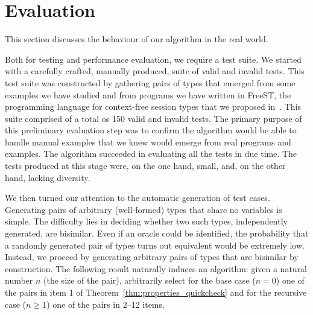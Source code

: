 \section{Evaluation}
\label{sec:evaluation}

This section discusses the behaviour of our algorithm in the real
world.

Both for testing and performance evaluation, we require a test
suite. We started with a carefully crafted, manually produced, suite of
valid and invalid tests. This test suite was constructed by gathering
pairs of types that emerged from some examples we have
studied and from programs we have written in FreeST, the programming language 
for context-free session types that we 
proposed in~\cite{almeida.etal_freest-functional-language}.
This suite comprised of a total os 150 valid and invalid tests.
The primary purpose of this preliminary evaluation
step was to confirm the algorithm would be able to handle
manual examples that we knew would emerge from real programs and
examples. The algorithm succeeded in evaluating all the tests in due time.
The tests produced at this stage were, on the one hand,
small, and, on the other hand, lacking diversity. 

We then turned our
attention to the automatic generation of test cases. Generating pairs
of arbitrary (well-formed) types that share no variables is
simple. The difficulty lies in deciding whether two such types,
independently generated, are bisimilar. Even if an oracle could be
identified, the probability that a randomly generated pair of types
turns out equivalent would be extremely low. Instead, we proceed by
generating arbitrary pairs of types that are bisimilar by
construction. The following result naturally induces an algorithm:
given a natural number $n$ (the size of the pair), arbitrarily select
for the base case ($n=0$) one of the pairs in item 1 of 
Theorem~\ref{thm:properties_quickcheck} and for the
recursive case ($n\ge1$) one of the pairs in 2--12 items.

